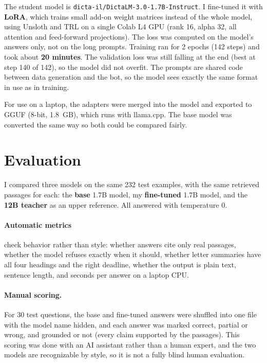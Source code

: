 \documentclass[11pt]{article}
\begin{document}
The student model is \texttt{dicta-il/DictaLM-3.0-1.7B-Instruct}. I fine-tuned it with \textbf{LoRA}, which trains small add-on weight matrices instead of the whole model, using Unsloth and TRL on a single Colab L4 GPU (rank 16, alpha 32, all attention and feed-forward projections). The loss was computed on the model's answers only, not on the long prompts. Training ran for 2 epochs (142 steps) and took about \textbf{20 minutes}. The validation loss was still falling at the end (best at step 140 of 142), so the model did not overfit. The prompts are shared code between data generation and the bot, so the model sees exactly the same format in use as in training.

For use on a laptop, the adapters were merged into the model and exported to GGUF (8-bit, 1.8~GB), which runs with llama.cpp. The base model was converted the same way so both could be compared fairly.

\section{Evaluation}

I compared three models on the same 232 test examples, with the same retrieved passages for each: the \textbf{base} 1.7B model, my \textbf{fine-tuned} 1.7B model, and the \textbf{12B teacher} as an upper reference. All answered with temperature 0.

\paragraph{Automatic metrics} check behavior rather than style: whether answers cite only real passages, whether the model refuses exactly when it should, whether letter summaries have all four headings and the right deadline, whether the output is plain text, sentence length, and seconds per answer on a laptop CPU.

\paragraph{Manual scoring.} For 30 test questions, the base and fine-tuned answers were shuffled into one file with the model name hidden, and each answer was marked correct, partial or wrong, and grounded or not (every claim supported by the passages). This scoring was done with an AI assistant rather than a human expert, and the two models are recognizable by style, so it is not a fully blind human evaluation.
\end{document}
